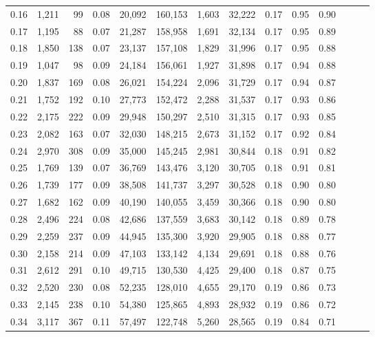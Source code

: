 \begin{tabular}{rrrrrrrrrrrrrr}
0.16 &  1,211 &   99 &  0.08 &   20,092 &  160,153 &   1,603 &  32,222 &  0.17 &  0.95 &      0.90 \\
0.17 &  1,195 &   88 &  0.07 &   21,287 &  158,958 &   1,691 &  32,134 &  0.17 &  0.95 &      0.89 \\
0.18 &  1,850 &  138 &  0.07 &   23,137 &  157,108 &   1,829 &  31,996 &  0.17 &  0.95 &      0.88 \\
0.19 &  1,047 &   98 &  0.09 &   24,184 &  156,061 &   1,927 &  31,898 &  0.17 &  0.94 &      0.88 \\
0.20 &  1,837 &  169 &  0.08 &   26,021 &  154,224 &   2,096 &  31,729 &  0.17 &  0.94 &      0.87 \\
0.21 &  1,752 &  192 &  0.10 &   27,773 &  152,472 &   2,288 &  31,537 &  0.17 &  0.93 &      0.86 \\
0.22 &  2,175 &  222 &  0.09 &   29,948 &  150,297 &   2,510 &  31,315 &  0.17 &  0.93 &      0.85 \\
0.23 &  2,082 &  163 &  0.07 &   32,030 &  148,215 &   2,673 &  31,152 &  0.17 &  0.92 &      0.84 \\
0.24 &  2,970 &  308 &  0.09 &   35,000 &  145,245 &   2,981 &  30,844 &  0.18 &  0.91 &      0.82 \\
0.25 &  1,769 &  139 &  0.07 &   36,769 &  143,476 &   3,120 &  30,705 &  0.18 &  0.91 &      0.81 \\
0.26 &  1,739 &  177 &  0.09 &   38,508 &  141,737 &   3,297 &  30,528 &  0.18 &  0.90 &      0.80 \\
0.27 &  1,682 &  162 &  0.09 &   40,190 &  140,055 &   3,459 &  30,366 &  0.18 &  0.90 &      0.80 \\
0.28 &  2,496 &  224 &  0.08 &   42,686 &  137,559 &   3,683 &  30,142 &  0.18 &  0.89 &      0.78 \\
0.29 &  2,259 &  237 &  0.09 &   44,945 &  135,300 &   3,920 &  29,905 &  0.18 &  0.88 &      0.77 \\
0.30 &  2,158 &  214 &  0.09 &   47,103 &  133,142 &   4,134 &  29,691 &  0.18 &  0.88 &      0.76 \\
0.31 &  2,612 &  291 &  0.10 &   49,715 &  130,530 &   4,425 &  29,400 &  0.18 &  0.87 &      0.75 \\
0.32 &  2,520 &  230 &  0.08 &   52,235 &  128,010 &   4,655 &  29,170 &  0.19 &  0.86 &      0.73 \\
0.33 &  2,145 &  238 &  0.10 &   54,380 &  125,865 &   4,893 &  28,932 &  0.19 &  0.86 &      0.72 \\
0.34 &  3,117 &  367 &  0.11 &   57,497 &  122,748 &   5,260 &  28,565 &  0.19 &  0.84 &      0.71 \\

\end{tabular}
